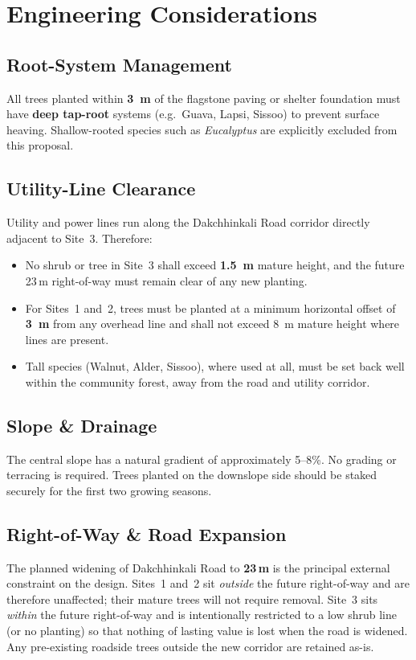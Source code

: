 \documentclass[11pt,a4paper]{article}
\begin{document}
\section{Engineering Considerations}
\label{sec:engineering}

\subsection{Root-System Management}
All trees planted within \textbf{3~m} of the flagstone paving or shelter foundation must have \textbf{deep tap-root} systems (e.g.\ Guava, Lapsi, Sissoo) to prevent surface heaving. Shallow-rooted species such as \emph{Eucalyptus} are explicitly excluded from this proposal.

\subsection{Utility-Line Clearance}
Utility and power lines run along the Dakchhinkali Road corridor directly adjacent to Site~3. Therefore:
\begin{itemize}
  \item No shrub or tree in Site~3 shall exceed \textbf{1.5~m} mature height, and the future 23\,m right-of-way must remain clear of any new planting.
  \item For Sites~1 and~2, trees must be planted at a minimum horizontal offset of \textbf{3~m} from any overhead line and shall not exceed 8~m mature height where lines are present.
  \item Tall species (Walnut, Alder, Sissoo), where used at all, must be set back well within the community forest, away from the road and utility corridor.
\end{itemize}

\subsection{Slope \& Drainage}
The central slope has a natural gradient of approximately 5--8\%. No grading or terracing is required. Trees planted on the downslope side should be staked securely for the first two growing seasons.

\subsection{Right-of-Way \& Road Expansion}
The planned widening of Dakchhinkali Road to \textbf{23\,m} is the principal external constraint on the design. Sites~1 and~2 sit \emph{outside} the future right-of-way and are therefore unaffected; their mature trees will not require removal. Site~3 sits \emph{within} the future right-of-way and is intentionally restricted to a low shrub line (or no planting) so that nothing of lasting value is lost when the road is widened. Any pre-existing roadside trees outside the new corridor are retained as-is.
\end{document}
